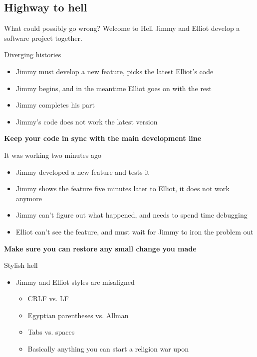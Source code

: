 \documentclass[presentation]{beamer}
\begin{document}
\subsection{Highway to hell}

\newcommand{\baddev}[0]{Jimmy}
\newcommand{\gooddev}[0]{Elliot}

\begin{frame}{What could possibly go wrong? Welcome to Hell }
	\baddev{}\cite{jargon} and \gooddev{} develop a software project together.
	\begin{block}{Diverging histories}
		\begin{itemize}
			\item \baddev{} must develop a new feature, picks the latest \gooddev{}'s code
			\item \baddev{} begins, and in the meantime \gooddev{} goes on with the rest
			\item \baddev{} completes his part
			\item \baddev{}'s code does not work the latest version
		\end{itemize}
		\textbf{Keep your code in sync with the main development line}
	\end{block}
	\begin{block}{It was working two minutes ago}
		\begin{itemize}
			\item \baddev{} developed a new feature and tests it
			\item \baddev{} shows the feature five minutes later to \gooddev{}, it does not work anymore
			\item \baddev{} can't figure out what happened, and needs to spend time debugging
			\item \gooddev{} can't see the feature, and must wait for \baddev{} to iron the problem out
		\end{itemize}
		\textbf{Make sure you can restore any small change you made}
	\end{block}
	\begin{block}{Stylish hell}
		\begin{itemize}
			\item \baddev{} and \gooddev{} styles are misaligned
			\begin{itemize}
				\item CRLF vs. LF
				\item Egyptian parentheses \cite{jargon} vs. Allman
				\item Tabs vs. spaces
				\item Basically anything you can start a religion war upon

\end{itemize}
\end{itemize}
\end{block}
\end{frame}
\end{document}
